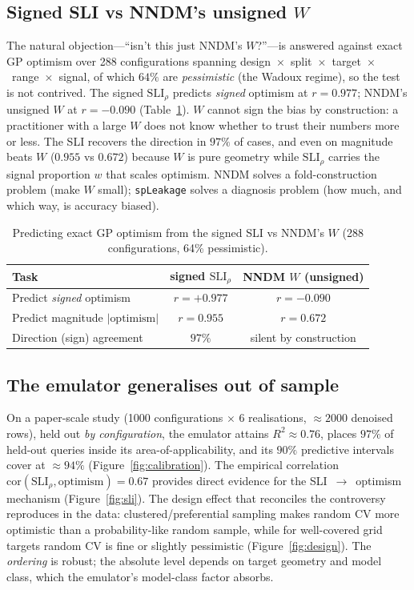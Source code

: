 \documentclass[11pt,a4paper]{article}
\newcommand{\SLI}{\mathrm{SLI}}
\newcommand{\SLIrho}{\SLI_{\rho}}
\newcommand{\cor}{\mathrm{cor}}
\begin{document}
\subsection{Signed SLI vs NNDM's unsigned \texorpdfstring{$W$}{W}}\label{sec:res-benchmark}

The natural objection---``isn't this just NNDM's $W$?''---is answered against exact
GP optimism over 288 configurations spanning
design~$\times$~split~$\times$~target~$\times$~range~$\times$~signal, of which
$64\%$ are \emph{pessimistic} (the Wadoux regime), so the test is not contrived.
The signed $\SLIrho$ predicts \emph{signed} optimism at $r=0.977$; NNDM's unsigned
$W$ at $r=-0.090$ (Table~\ref{tab:benchmark}). $W$ cannot sign the bias by
construction: a practitioner with a large $W$ does not know whether to trust their
numbers more or less. The SLI recovers the direction in $97\%$ of cases, and even on
magnitude beats $W$ ($0.955$ vs $0.672$) because $W$ is pure geometry while
$\SLIrho$ carries the signal proportion $w$ that scales optimism. NNDM solves a
fold-construction problem (make $W$ small); \texttt{spLeakage} solves a diagnosis
problem (how much, and which way, is accuracy biased).

\begin{table}[t]
\centering
\caption{Predicting exact GP optimism from the signed SLI vs NNDM's $W$
(288 configurations, 64\% pessimistic).}
\label{tab:benchmark}
\small
\begin{tabular}{l c c}
\toprule
Task & signed $\SLIrho$ & NNDM $W$ (unsigned)\\
\midrule
Predict \emph{signed} optimism & $r=+0.977$ & $r=-0.090$\\
Predict magnitude $\lvert\text{optimism}\rvert$ & $r=0.955$ & $r=0.672$\\
Direction (sign) agreement & $97\%$ & silent by construction\\
\bottomrule
\end{tabular}
\end{table}

\subsection{The emulator generalises out of sample}\label{sec:res-emulator}

On a paper-scale study (1000 configurations $\times$ 6 realisations,
$\approx 2000$ denoised rows), held out \emph{by configuration}, the emulator
attains $R^2\approx 0.76$, places $97\%$ of held-out queries inside its
area-of-applicability, and its $90\%$ predictive intervals cover at
$\approx 94\%$ (Figure~\ref{fig:calibration}). The empirical correlation
$\cor(\SLIrho,\text{optimism})=0.67$ provides direct evidence for the
SLI~$\to$~optimism mechanism (Figure~\ref{fig:sli}). The design effect that
reconciles the controversy reproduces in the data: clustered/preferential sampling
makes random CV more optimistic than a probability-like random sample, while for
well-covered grid targets random CV is fine or slightly pessimistic
(Figure~\ref{fig:design}). The \emph{ordering} is robust; the absolute level depends
on target geometry and model class, which the emulator's model-class factor
absorbs.
\end{document}
